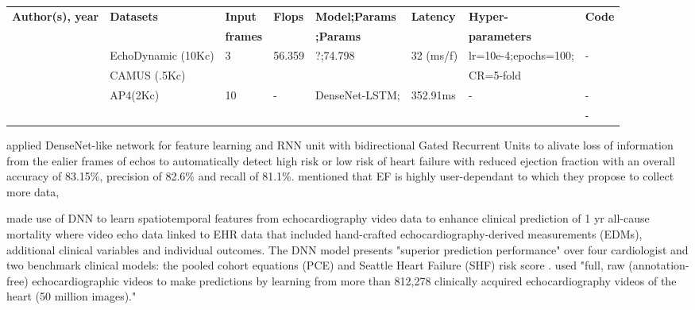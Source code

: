 \begin{table}[]
\tiny
\begin{tabular}{llllllll}
\textbf{Author(s), year} & \textbf{Datasets}                   & \textbf{Input}        & \textbf{Flops} & \textbf{Model;Params} & \textbf{Latency}  & \textbf{Hyper-}      & \textbf{Code} \\
                         &                                     & \textbf{frames}       &                & \textbf{;Params}      &                   & \textbf{parameters}  &               \\
\cite{wu20222}           &  EchoDynamic (10Kc)                 & 3                     & 56.359         & ?;74.798              & 32 (ms/f)         & lr=10e-4;epochs=100; & -             \\
                         &  CAMUS (.5Kc)                       &                       &                &                       &                   & CR=5-fold            &          \\
\cite{woudenberg2018}    & AP4(2Kc)                            & 10                    & -              & DenseNet-LSTM;        & 352.91ms          & -                    & -             \\
                         &                                     &                       &                &                       &                   &                      & -
\end{tabular}
\end{table}




 \cite{behnami2020} applied DenseNet-like network for feature learning and RNN unit with bidirectional Gated Recurrent Units to alivate loss of information from the ealier frames of echos to automatically detect high risk or low risk of heart failure with reduced ejection fraction with an overall accuracy of 83.15\%, precision of 82.6\% and recall of 81.1\%.
\cite{behnami2020} mentioned that EF is highly user-dependant to which they propose to collect more data,

\cite{ulloaCerna2021} made use of DNN to learn spatiotemporal features from echocardiography video data to enhance clinical prediction of 1 yr all-cause mortality where video echo data linked to EHR data that included hand-crafted echocardiography-derived measurements (EDMs), additional clinical variables and individual outcomes.
The DNN model presents "superior prediction performance" over four cardiologist and two benchmark clinical models: the pooled cohort equations (PCE) and Seattle Heart Failure (SHF) risk score \cite{ulloaCerna2021}. 
\cite{ulloaCerna2021} used "full, raw (annotation-free) echocardiographic videos to make predictions by learning from more than 812,278 clinically acquired echocardiography videos of the heart (50 million images)."

